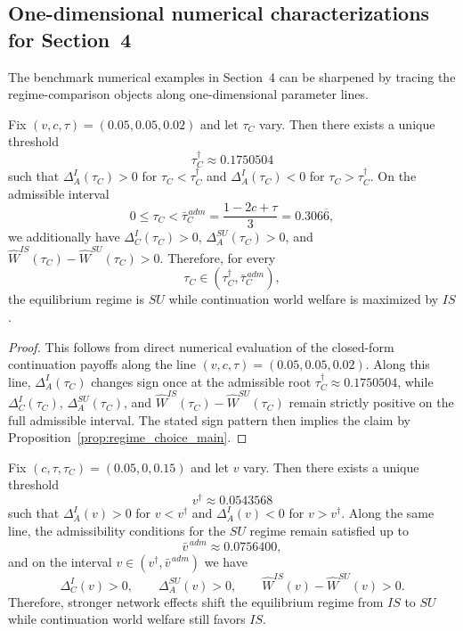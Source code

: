 \subsection{One-dimensional numerical characterizations for Section~4}

The benchmark numerical examples in Section~4 can be sharpened by tracing the
regime-comparison objects along one-dimensional parameter lines.

\begin{lemma}
\label{lem:prop2_interval}
Fix $(v,c,\tau)=(0.05,0.05,0.02)$ and let $\tau_C$ vary. Then there exists a
unique threshold
\[
\tau_C^\dagger \approx 0.1750504
\]
such that $\Delta_A^I(\tau_C)>0$ for $\tau_C<\tau_C^\dagger$ and
$\Delta_A^I(\tau_C)<0$ for $\tau_C>\tau_C^\dagger$. On the admissible interval
\[
0\le \tau_C<\bar\tau_C^{\,adm}=\frac{1-2c+\tau}{3}=0.306\overline{6},
\]
we additionally have $\Delta_C^I(\tau_C)>0$,
$\Delta_A^{SU}(\tau_C)>0$, and
$\widehat W^{IS}(\tau_C)-\widehat W^{SU}(\tau_C)>0$. Therefore, for every
\[
\tau_C\in(\tau_C^\dagger,\bar\tau_C^{\,adm}),
\]
the equilibrium regime is $SU$ while continuation world welfare is maximized by
$IS$.
\end{lemma}

\begin{proof}
This follows from direct numerical evaluation of the closed-form continuation
payoffs along the line $(v,c,\tau)=(0.05,0.05,0.02)$. Along this line,
$\Delta_A^I(\tau_C)$ changes sign once at the admissible root
$\tau_C^\dagger \approx 0.1750504$, while $\Delta_C^I(\tau_C)$,
$\Delta_A^{SU}(\tau_C)$, and
$\widehat W^{IS}(\tau_C)-\widehat W^{SU}(\tau_C)$ remain strictly positive on
the full admissible interval. The stated sign pattern then implies the claim by
Proposition~\ref{prop:regime_choice_main}.
\end{proof}

\begin{lemma}
\label{lem:prop3_threshold}
Fix $(c,\tau,\tau_C)=(0.05,0,0.15)$ and let $v$ vary. Then there exists a
unique threshold
\[
v^\dagger \approx 0.0543568
\]
such that $\Delta_A^I(v)>0$ for $v<v^\dagger$ and $\Delta_A^I(v)<0$ for
$v>v^\dagger$. Along the same line, the admissibility conditions for the $SU$
regime remain satisfied up to
\[
\bar v^{\,adm}\approx 0.0756400,
\]
and on the interval $v\in(v^\dagger,\bar v^{\,adm})$ we have
\[
\Delta_C^I(v)>0,\qquad \Delta_A^{SU}(v)>0,\qquad
\widehat W^{IS}(v)-\widehat W^{SU}(v)>0.
\]
Therefore, stronger network effects shift the equilibrium regime from $IS$ to
$SU$ while continuation world welfare still favors $IS$.
\end{lemma}

